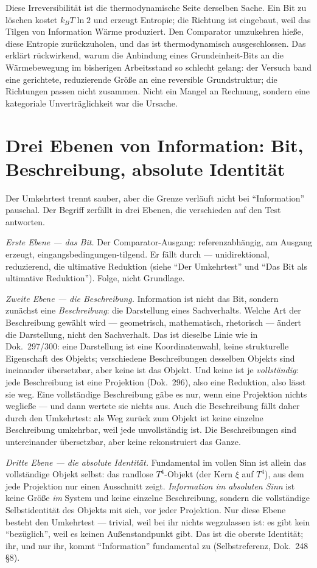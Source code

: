 Diese Irreversibilität ist die thermodynamische Seite derselben Sache. Ein Bit
zu löschen kostet $k_B T \ln 2$ und erzeugt Entropie; die Richtung ist
eingebaut, weil das Tilgen von Information Wärme produziert. Den Comparator
umzukehren hieße, diese Entropie zurückzuholen, und das ist thermodynamisch
ausgeschlossen. Das erklärt rückwirkend, warum die Anbindung eines
Grundeinheit-Bits an die Wärmebewegung im bisherigen Arbeitsstand so schlecht
gelang: der Versuch band eine gerichtete, reduzierende Größe an eine reversible
Grundstruktur; die Richtungen passen nicht zusammen. Nicht ein Mangel an
Rechnung, sondern eine kategoriale Unverträglichkeit war die Ursache.

\section{Drei Ebenen von Information: Bit, Beschreibung, absolute Identität}

Der Umkehrtest trennt sauber, aber die Grenze verläuft nicht bei
\enquote{Information} pauschal. Der Begriff zerfällt in drei Ebenen, die
verschieden auf den Test antworten.

\emph{Erste Ebene --- das Bit.} Der Comparator-Ausgang: referenzabhängig, am
Ausgang erzeugt, eingangsbedingungen-tilgend. Er fällt durch --- unidirektional,
reduzierend, die ultimative Reduktion (siehe \enquote{Der Umkehrtest} und
\enquote{Das Bit als ultimative Reduktion}). Folge, nicht Grundlage.

\emph{Zweite Ebene --- die Beschreibung.} Information ist nicht das Bit, sondern
zunächst eine \emph{Beschreibung}: die Darstellung eines Sachverhalts. Welche
Art der Beschreibung gewählt wird --- geometrisch, mathematisch, rhetorisch ---
ändert die Darstellung, nicht den Sachverhalt. Das ist dieselbe Linie wie in
Dok.~297/300: eine Darstellung ist eine Koordinatenwahl, keine strukturelle
Eigenschaft des Objekts; verschiedene Beschreibungen desselben Objekts sind
ineinander übersetzbar, aber keine ist das Objekt. Und keine ist je
\emph{vollständig}: jede Beschreibung ist eine Projektion (Dok.~296), also eine
Reduktion, also lässt sie weg. Eine vollständige Beschreibung gäbe es nur, wenn
eine Projektion nichts wegließe --- und dann wertete sie nichts aus. Auch die
Beschreibung fällt daher durch den Umkehrtest: als Weg zurück zum Objekt ist
keine einzelne Beschreibung umkehrbar, weil jede unvollständig ist. Die
Beschreibungen sind untereinander übersetzbar, aber keine rekonstruiert das
Ganze.

\emph{Dritte Ebene --- die absolute Identität.} Fundamental im vollen Sinn ist
allein das vollständige Objekt selbst: das randlose $T^4$-Objekt (der Kern
$\xi$ auf $T^4$), aus dem jede Projektion nur einen Ausschnitt zeigt.
\emph{Information im absoluten Sinn} ist keine Größe \emph{im} System und keine
einzelne Beschreibung, sondern die vollständige Selbstidentität des Objekts mit
sich, vor jeder Projektion. Nur diese Ebene besteht den Umkehrtest --- trivial,
weil bei ihr nichts wegzulassen ist: es gibt kein \enquote{bezüglich}, weil es
keinen Außenstandpunkt gibt. Das ist die oberste Identität; ihr, und nur ihr,
kommt \enquote{Information} fundamental zu (Selbstreferenz, Dok.~248 §8).

